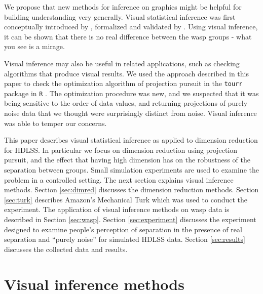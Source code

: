 We propose that new methods for inference on graphics might be helpful for building understanding very generally. Visual statistical inference was first conceptually introduced by \cite{buja:2009}, formalized and validated by \cite{majumder:2013}. Using visual inference, it can be shown that there is no real difference between the wasp groups - what you see is a mirage. 

Visual inference may also be useful in related applications, such as checking algorithms that produce visual results. We used the approach described in this paper to check the optimization algorithm of projection pursuit in the \texttt{tourr} package \citep{tourr:2011} in \texttt{R} \citep{r}. The optimization procedure was new, and we suspected that it was being sensitive to the order of data values, and returning projections of purely noise data that we thought were surprisingly distinct from noise. Visual inference was able to temper our concerns.   

This paper describes visual statistical inference as applied to dimension reduction for HDLSS. In particular we focus on dimension reduction using projection pursuit, and the effect that having high dimension has on the robustness of the separation between groups.  Small simulation experiments are used to examine the problem in a controlled setting. The next section explains visual inference methods. Section \ref{sec:dimred} discusses the dimension reduction methods. Section \ref{sec:turk} describes Amazon's Mechanical Turk  \citep{turk}  which was used to conduct the experiment. The application of visual inference methods on wasp data is described in Section \ref{sec:wasp}. Section \ref{sec:experiment} discusses the experiment designed to examine people's perception of separation in the presence of real separation and ``purely noise'' for simulated HDLSS data. Section \ref{sec:results} discusses the collected data and results. 


\section{Visual inference methods} \label{sec:inference}


